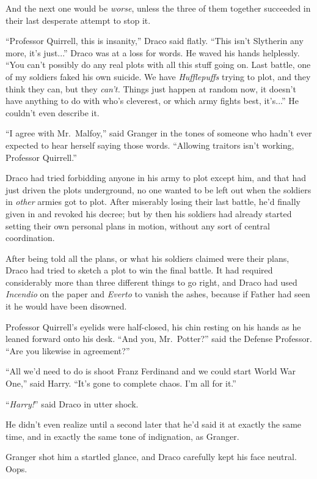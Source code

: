And the next one would be \emph{worse}, unless the three of them together succeeded in their last desperate attempt to stop it.

“Professor Quirrell, this is insanity,” Draco said flatly. “This isn’t Slytherin any more, it’s just...” Draco was at a loss for words. He waved his hands helplessly. “You can’t possibly do any real plots with all this stuff going on. Last battle, one of my soldiers faked his own suicide. We have \emph{Hufflepuffs} trying to plot, and they think they can, but they \emph{can’t.} Things just happen at random now, it doesn’t have anything to do with who’s cleverest, or which army fights best, it’s...” He couldn’t even describe it.

“I agree with Mr.~Malfoy,” said Granger in the tones of someone who hadn’t ever expected to hear herself saying those words. “Allowing traitors isn’t working, Professor Quirrell.”

Draco had tried forbidding anyone in his army to plot except him, and that had just driven the plots underground, no one wanted to be left out when the soldiers in \emph{other} armies got to plot. After miserably losing their last battle, he’d finally given in and revoked his decree; but by then his soldiers had already started setting their own personal plans in motion, without any sort of central coordination.

After being told all the plans, or what his soldiers claimed were their plans, Draco had tried to sketch a plot to win the final battle. It had required considerably more than three different things to go right, and Draco had used \emph{Incendio} on the paper and \emph{Everto} to vanish the ashes, because if Father had seen it he would have been disowned.

Professor Quirrell’s eyelids were half-closed, his chin resting on his hands as he leaned forward onto his desk. “And you, Mr.~Potter?” said the Defense Professor. “Are you likewise in agreement?”

“All we’d need to do is shoot Franz Ferdinand and we could start World War One,” said Harry. “It’s gone to complete chaos. I’m all for it.”

“\emph{Harry!}” said Draco in utter shock.

He didn’t even realize until a second later that he’d said it at exactly the same time, and in exactly the same tone of indignation, as Granger.

Granger shot him a startled glance, and Draco carefully kept his face neutral. Oops.

